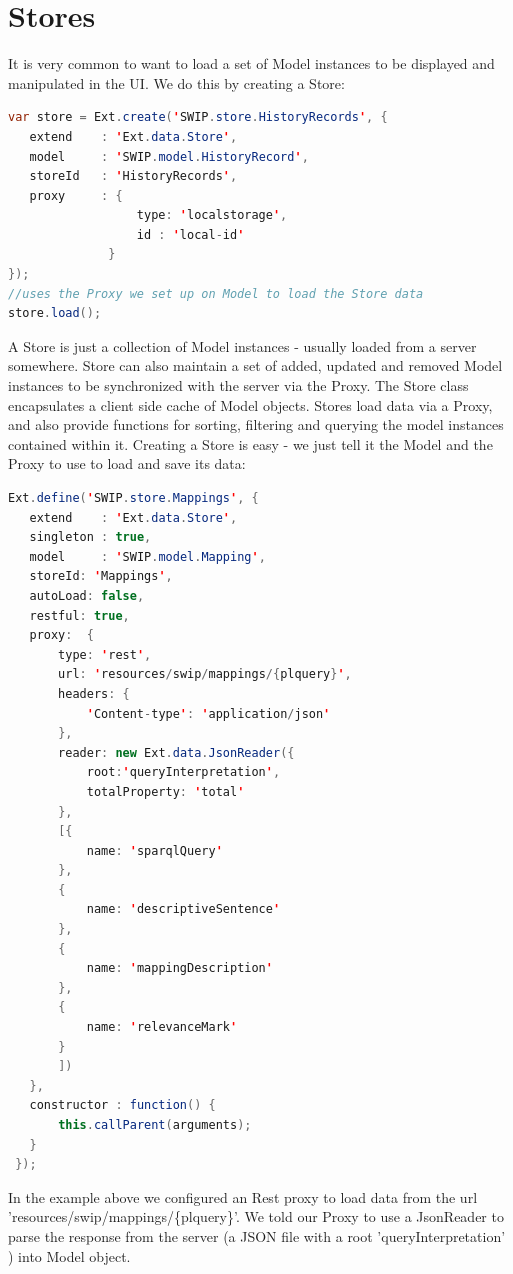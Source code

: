 \section{Stores}
\par It is very common to want to load a set of Model instances to be displayed and manipulated in the UI. We do this by creating a Store: \\
\begin{lstlisting}[language=Java]
var store = Ext.create('SWIP.store.HistoryRecords', {
   extend    : 'Ext.data.Store',
   model     : 'SWIP.model.HistoryRecord',
   storeId   : 'HistoryRecords',
   proxy     : {
                  type: 'localstorage',
                  id : 'local-id'
              }
});
//uses the Proxy we set up on Model to load the Store data
store.load();
\end{lstlisting}
\par A Store is just a collection of Model instances - usually loaded from a server somewhere. Store can also maintain a set of added, updated and removed Model instances to be synchronized with the server via the Proxy. The Store class encapsulates a client side cache of Model objects. Stores load data via a Proxy, and also provide functions for sorting, filtering and querying the model instances contained within it. Creating a Store is easy - we just tell it the Model and the Proxy to use to load and save its data:\\
\begin{lstlisting}[language=Java]
Ext.define('SWIP.store.Mappings', {
   extend    : 'Ext.data.Store',
   singleton : true,
   model     : 'SWIP.model.Mapping',
   storeId: 'Mappings',
   autoLoad: false,
   restful: true,
   proxy:  {
       type: 'rest',
       url: 'resources/swip/mappings/{plquery}',    
       headers: {
           'Content-type': 'application/json'
       },
       reader: new Ext.data.JsonReader({
           root:'queryInterpretation',
           totalProperty: 'total'  
       },
       [{
           name: 'sparqlQuery'
       },
       {
           name: 'descriptiveSentence'
       },
       {
           name: 'mappingDescription'
       },
       {
           name: 'relevanceMark'
       } 
       ])
   },
   constructor : function() {
       this.callParent(arguments);
   }                                                                  
 });
\end{lstlisting}
\par In the example above we configured an Rest proxy to load data from the url 'resources/swip/mappings/\{plquery\}'. We told our Proxy to use a JsonReader to parse the response from the server (a JSON file with a root 'queryInterpretation' ) into Model object. \\
